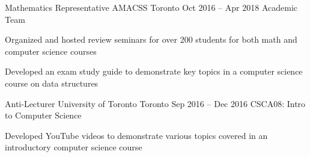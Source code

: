 \begin{cventries}
  \cventry
    {Mathematics Representative}
    {AMACSS}
    {Toronto}
    {Oct 2016 -- Apr 2018}
    {Academic Team}
    {
      \begin{cvitems}
        \item {Organized and hosted review seminars for over 200 students for both math and computer science courses}
        \item {Developed an exam study guide to demonstrate key topics in a computer science course on data structures}
      \end{cvitems}
    }
  \cventry
    {Anti-Lecturer}
    {University of Toronto}
    {Toronto}
    {Sep 2016 -- Dec 2016}
    {CSCA08: Intro to Computer Science}
    {
      \begin{cvitems}
        \item {Developed YouTube videos to demonstrate various topics covered in an introductory computer science course}
      \end{cvitems}
    }
\end{cventries}

